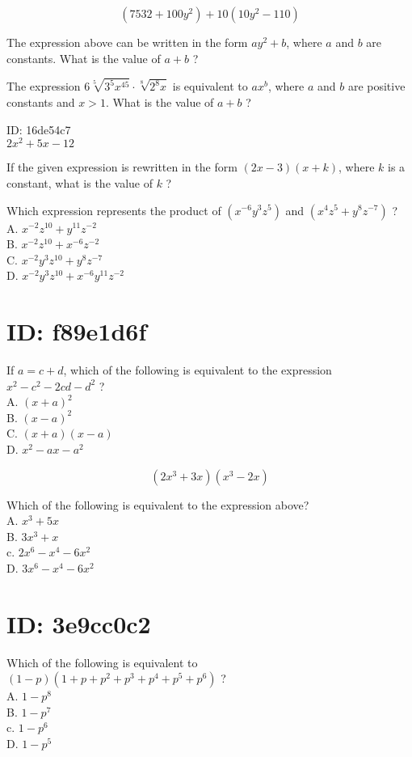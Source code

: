 $$
\left(7532+100 y^{2}\right)+10\left(10 y^{2}-110\right)
$$

The expression above can be written in the form $a y^{2}+b$, where $a$ and $b$ are constants. What is the value of $a+b$ ?

The expression $6 \sqrt[5]{3^{5} x^{45}} \cdot \sqrt[8]{2^{8} x}$ is equivalent to $a x^{b}$, where $a$ and $b$ are positive constants and $x>1$. What is the value of $a+b$ ?

ID: 16de54c7\\
$2 x^{2}+5 x-12$

If the given expression is rewritten in the form $(2 x-3)(x+k)$, where $k$ is a constant, what is the value of $k$ ?

Which expression represents the product of $\left(x^{-6} y^{3} z^{5}\right)$ and $\left(x^{4} z^{5}+y^{8} z^{-7}\right)$ ?\\
A. $x^{-2} z^{10}+y^{11} z^{-2}$\\
B. $x^{-2} z^{10}+x^{-6} z^{-2}$\\
C. $x^{-2} y^{3} z^{10}+y^{8} z^{-7}$\\
D. $x^{-2} y^{3} z^{10}+x^{-6} y^{11} z^{-2}$

\section*{ID: f89e1d6f}
If $a=c+d$, which of the following is equivalent to the expression $x^{2}-c^{2}-2 c d-d^{2}$ ?\\
A. $(x+a)^{2}$\\
B. $(x-a)^{2}$\\
C. $(x+a)(x-a)$\\
D. $x^{2}-a x-a^{2}$

$$
\left(2 x^{3}+3 x\right)\left(x^{3}-2 x\right)
$$

Which of the following is equivalent to the expression above?\\
A. $x^{3}+5 x$\\
B. $3 x^{3}+x$\\
c. $2 x^{6}-x^{4}-6 x^{2}$\\
D. $3 x^{6}-x^{4}-6 x^{2}$

\section*{ID: 3e9cc0c2}
Which of the following is equivalent to\\
$(1-p)\left(1+p+p^{2}+p^{3}+p^{4}+p^{5}+p^{6}\right)$ ?\\
A. $1-p^{8}$\\
B. $1-p^{7}$\\
c. $1-p^{6}$\\
D. $1-p^{5}$

